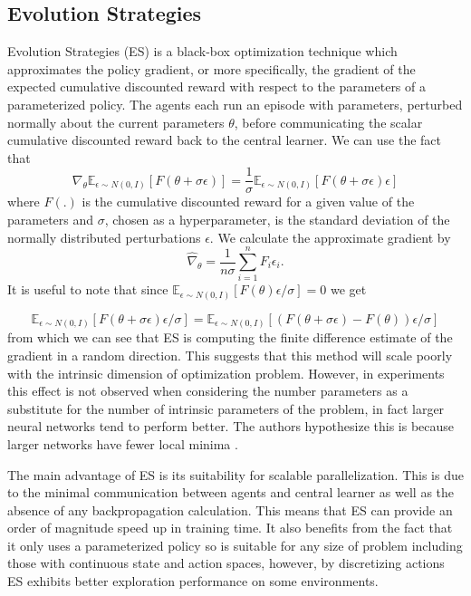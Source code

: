 \subsection{Evolution Strategies}
\label{sec:ES}
Evolution Strategies (ES) \cite{ES} is a black-box optimization technique which approximates the policy gradient, or more specifically, the gradient of the expected cumulative discounted reward with respect to the parameters of a parameterized policy.
The agents each run an episode with parameters, perturbed normally about the current parameters $\theta$, before communicating the scalar cumulative discounted reward back to the central learner.
We can use the fact that
\begin{equation*}
        \nabla_\theta \mathbb{E}_{\epsilon \sim N(0,I)}[F(\theta+\sigma \epsilon)] = \frac{1}{\sigma}\mathbb{E}_{\epsilon \sim N(0,I)}[F(\theta+\sigma \epsilon) \epsilon]
\end{equation*}
where $F(.)$ is the cumulative discounted reward for a given value of the parameters and $\sigma$, chosen as a hyperparameter, is the standard deviation of the normally distributed perturbations $\epsilon$.
We calculate the approximate gradient by
\begin{equation}
        \hat{\nabla}_\theta = \frac{1}{n\sigma}\sum^n_{i=1} F_i \epsilon_i.
        \label{eq:grad}
\end{equation}
It is useful to note that since $\mathbb{E}_{\epsilon \sim N(0,I)}[F(\theta)\epsilon/\sigma] = 0$ we get

\begin{equation*}
    \mathbb{E}_{\epsilon \sim N(0,I)}[F(\theta+\sigma \epsilon) \epsilon/\sigma] = \mathbb{E}_{\epsilon \sim N(0,I)}[(F(\theta+\sigma \epsilon) - F(\theta))\epsilon/\sigma]
\end{equation*}
from which we can see that ES is computing the finite difference estimate of the gradient in a random direction. This suggests that this method will scale poorly with the intrinsic dimension of optimization problem. However, in experiments this effect is not observed when considering the number parameters as a substitute for the number of intrinsic parameters of the problem, in fact larger neural networks tend to perform better. The authors hypothesize this is because larger networks have fewer local minima \cite{LocalMinima}.

The main advantage of ES is its suitability for scalable parallelization. This is due to the minimal communication between agents and central learner as well as the absence of any backpropagation calculation. This means that ES can provide an order of magnitude speed up in training time. It also benefits from the fact that it only uses a parameterized policy so is suitable for any size of problem including those with continuous state and action spaces, however, by discretizing actions ES exhibits better exploration performance on some environments.

